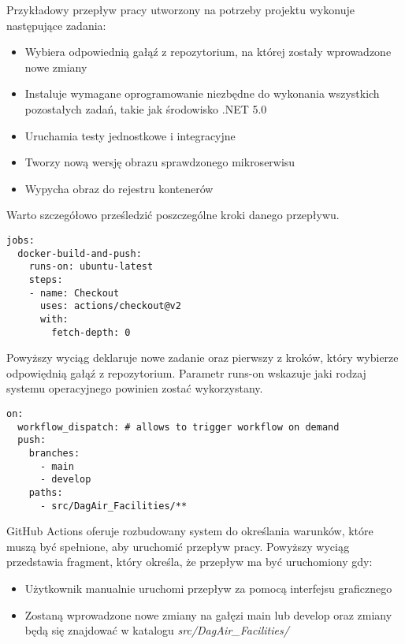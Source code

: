 Przykładowy przepływ pracy utworzony na potrzeby projektu wykonuje następujące zadania:

\begin{itemize} %
    \item Wybiera odpowiednią gałąź z repozytorium, na której zostały wprowadzone 
    nowe zmiany
    \item Instaluje wymagane oprogramowanie niezbędne do wykonania wszystkich 
    pozostałych zadań, takie jak środowisko .NET 5.0
    \item Uruchamia testy jednostkowe i integracyjne
    \item Tworzy nową wersję obrazu sprawdzonego mikroserwisu
    \item Wypycha obraz do rejestru kontenerów
\end{itemize}

Warto szczegółowo prześledzić poszczególne kroki danego przepływu.

\begin{lstlisting}
jobs:
  docker-build-and-push:
    runs-on: ubuntu-latest
    steps:
    - name: Checkout
      uses: actions/checkout@v2
      with:
        fetch-depth: 0
\end{lstlisting}

Powyższy wyciąg deklaruje nowe zadanie oraz pierwszy z kroków, który wybierze 
odpowiędnią gałąź z repozytorium. Parametr runs-on wskazuje jaki rodzaj systemu 
operacyjnego powinien zostać wykorzystany.

\begin{lstlisting}
on:
  workflow_dispatch: # allows to trigger workflow on demand
  push:
    branches: 
      - main
      - develop
    paths:
      - src/DagAir_Facilities/**
\end{lstlisting}

GitHub Actions oferuje rozbudowany system do określania warunków, które muszą być 
spełnione, aby uruchomić przepływ pracy. Powyższy wyciąg przedstawia fragment, który 
określa, że przepływ ma być uruchomiony gdy:

\begin{itemize} %
    \item Użytkownik manualnie uruchomi przepływ za pomocą interfejsu graficznego
    \item Zostaną wprowadzone nowe zmiany na gałęzi main lub develop oraz zmiany będą 
    się znajdować w katalogu \textit{src/DagAir\_Facilities/}
\end{itemize}

